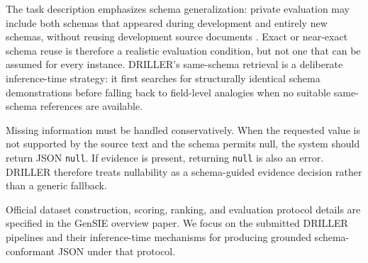 The task description emphasizes schema generalization: private evaluation may include both schemas that appeared during development and entirely new schemas, without reusing development source documents \cite{gensie2026taskdescription}. Exact or near-exact schema reuse is therefore a realistic evaluation condition, but not one that can be assumed for every instance. DRILLER's same-schema retrieval is a deliberate inference-time strategy: it first searches for structurally identical schema demonstrations before falling back to field-level analogies when no suitable same-schema references are available.

Missing information must be handled conservatively. When the requested value is not supported by the source text and the schema permits null, the system should return JSON \texttt{null}. If evidence is present, returning \texttt{null} is also an error. DRILLER therefore treats nullability as a schema-guided evidence decision rather than a generic fallback.

Official dataset construction, scoring, ranking, and evaluation protocol details are specified in the GenSIE overview paper. We focus on the submitted DRILLER pipelines and their inference-time mechanisms for producing grounded schema-conformant JSON under that protocol.
